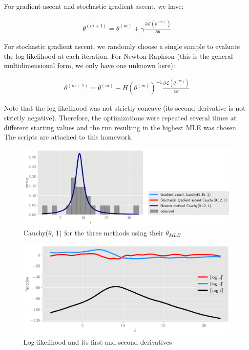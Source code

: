 \documentclass[11pt]{article}
\begin{document}
For gradient ascent and stochastic gradient ascent, we have:

\begin{align*}
    \theta^{(m+1)} = \theta^{(m)} + \gamma \frac{\partial \mathcal{L}(\theta^{(m)})}{\partial \theta}
\end{align*}

For stochastic gradient ascent, we randomly choose a single sample to evaluate the log likelihood at each iteration. For Newton-Raphson (this is the general multidimensional form, we only have one unknown here):

\begin{align*}
    \theta^{(m+1)} = \theta^{(m)} - H(\theta^{(m)})^{-1} \frac{\partial \mathcal{L}(\theta^{(m)})}{\partial \theta}
\end{align*}

Note that the log likelihood was not strictly concave (its second derivative is not strictly negative). Therefore, the optimizations were repeated several times at different starting values and the run resulting in the highest MLE was chosen. The scripts are attached to this homework.

\begin{figure}[!h]
    \centering
    \includegraphics[scale=.55]{homework_2/figures/mle_cauchy.png}
    \caption{Cauchy($\theta$, 1) for the three methods using their $\theta_{MLE}$}
    \label{fig:my_label}
\end{figure}

\begin{figure}[!h]
    \centering
    \includegraphics[scale=.55]{homework_2/figures/cauchy_fns.png}
    \caption{Log likelihood and its first and second derivatives}
    \label{fig:my_label}
\end{figure}
\end{document}
